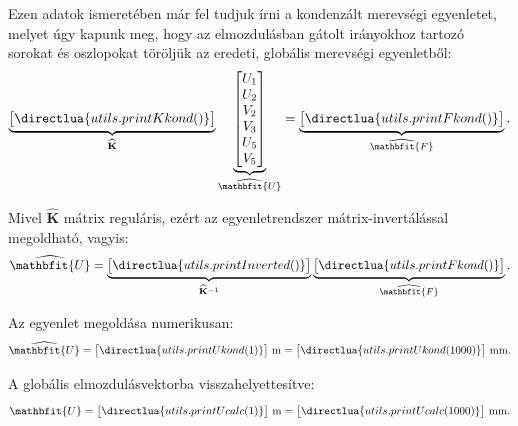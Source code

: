 \documentclass[a4paper, 12pt]{scrartcl}
\newcommand{\rvec}[1]{\mathbfit{#1}}
\newcommand{\rmat}[1]{\mathbf{#1}}
\begin{document}
Ezen adatok ismeretében már fel tudjuk írni a kondenzált merevségi egyenletet,
melyet úgy kapunk meg, hogy az elmozdulásban gátolt irányokhoz tartozó sorokat
és oszlopokat töröljük az eredeti, globális merevségi egyenletből:
\begin{equation}
  \underbrace{\begin{bmatrix}
      \directlua{utils.printKkond()}
    \end{bmatrix}}_{\widehat{\rmat K}}
  \underbrace{\begin{bmatrix}
      U_1 \\ U_2 \\ V_2 \\ V_3 \\ U_5 \\ V_5
    \end{bmatrix}}_{\widehat{\rvec U}}
  =
  \underbrace{\begin{bmatrix}
      \directlua{utils.printFkond()}
    \end{bmatrix}}_{\widehat{\rvec F}}
  .
  \label{eq:cond}
\end{equation}

Mivel $\widehat{\rmat K}$ mátrix reguláris, ezért az egyenletrendszer
mátrix-invertálással megoldható, vagyis:
\begin{equation}
  \widehat{\rvec U} =
  \underbrace{\begin{bmatrix}
      \directlua{utils.printInverted()}
    \end{bmatrix}}_{\widehat{\rmat K}^{-1}}
  \underbrace{\begin{bmatrix}
      \directlua{utils.printFkond()}
    \end{bmatrix}}_{\widehat{\rvec F}}
  .
  \label{eq:inverted}
\end{equation}

Az egyenlet megoldása numerikusan:
\begin{equation}
  \widehat{\rvec U} = \begin{bmatrix}
    \directlua{utils.printUkond(1)}
  \end{bmatrix} \, \mathrm{m}
  =
  \sisetup{
    exponent-mode = fixed,
    round-precision = 3
  }
  \begin{bmatrix}
    \directlua{utils.printUkond(1000)}
  \end{bmatrix} \, \mathrm{mm}.
  \label{eq:numericCond}
\end{equation}

A globális elmozdulásvektorba visszahelyettesítve:
\begin{equation}
  {\rvec U} = \begin{bmatrix}
    \directlua{utils.printUcalc(1)}
  \end{bmatrix} \, \mathrm{m}
  =
  \sisetup{
    exponent-mode = fixed,
    round-precision = 3
  }
  \begin{bmatrix}
    \directlua{utils.printUcalc(1000)}
  \end{bmatrix} \, \mathrm{mm}.
  \label{eq:Ucalc}
\end{equation}
\end{document}
